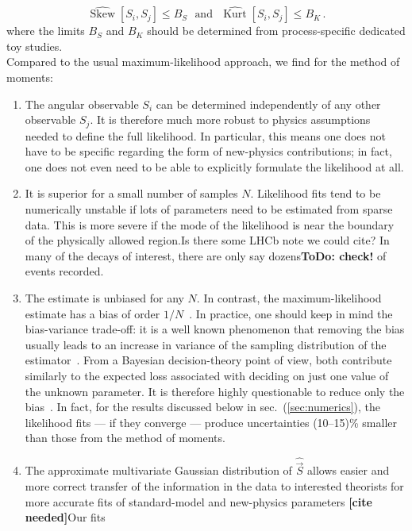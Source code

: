 \documentclass[aps,prd,reprint,nofootinbib,preprintnumbers]{revtex4}
\newcommand{\est}[1]{\widehat{#1}}
\newcommand{\refsec}[1]{sec.~(\ref{sec:#1})}
\newcommand{\vecest}[1]{\widehat{\vec{#1}}}
\DeclareMathOperator{\kurt}{Kurt}
\newcommand{\todo}[1]{{\color{red}\bf ToDo: #1}}
\newcommand{\fred}[1]{{\color{brown!85!black}#1}}
\newcommand{\citeneeded}{{\color{red}\bf [cite needed]}}
\begin{document}
\begin{equation}
    \est{\operatorname{Skew}}[S_i,S_j] \leq B_S\,\,\text{ and }\,\,\est{\kurt}[S_i,S_j] \leq B_K\,.
\end{equation}
where the limits $B_S$ and $B_K$ should be determined from process-specific dedicated toy studies.\\

Compared to the usual maximum-likelihood approach, we find for the method of moments:
\begin{enumerate}
  \item The angular observable ${S_i}$ can be determined
  independently of any other observable ${S_j}$. It is therefore
  much more robust to physics assumptions needed to define the full
  likelihood. In particular, this means one does not have to be
  specific regarding the form of new-physics contributions; in fact,
  one does not even need to be able to explicitly formulate the
  likelihood at all.
\item It is superior for a small number of samples $N$. Likelihood
  fits tend to be numerically unstable if lots of parameters need to
  be estimated from sparse data. This is more severe if the mode of
  the likelihood is near the boundary of the physically allowed
  region.\fred{Is there some LHCb note we could cite?} In many of the
  decays of interest, there are only say dozens\todo{check!} of events recorded.
\item The estimate is unbiased for any $N$. In contrast, the
  maximum-likelihood estimate has a bias of order
  $1/N$~\cite{Cox:1968}. In practice, one should keep in mind the
  bias-variance trade-off: it is a well known phenomenon that removing
  the bias usually leads to an increase in variance of the sampling
  distribution of the estimator~\cite[sec. 7.3]{James:2006zz}. From a
  Bayesian decision-theory point of view, both contribute similarly to
  the expected loss associated with deciding on just one value of the
  unknown parameter. It is therefore highly questionable to reduce
  only the bias~\cite[sections 13.8,17.2]{jaynes:2003}. In fact, for
  the results discussed below in \refsec{numerics}, the likelihood
  fits --- if they converge --- produce uncertainties (10--15)\%
  smaller than those from the method of moments.
  \item The approximate multivariate Gaussian distribution of $\vecest{S}$
  allows easier and more correct transfer of the information in the
  data to interested theorists for more accurate fits of
  standard-model and new-physics parameters \citeneeded\fred{Our fits
}
\end{enumerate}
\end{document}

